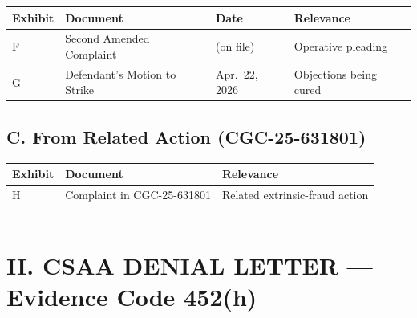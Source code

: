 {\def\LTcaptype{table} %
\begin{longtable}[]{@{}
  >{\raggedright\arraybackslash}p{}
  >{\raggedright\arraybackslash}p{}
  >{\raggedright\arraybackslash}p{}
  >{\raggedright\arraybackslash}p{}@{}}
\toprule\noalign{}
\begin{minipage}[b]{\linewidth}\raggedright
Exhibit
\end{minipage} & \begin{minipage}[b]{\linewidth}\raggedright
Document
\end{minipage} & \begin{minipage}[b]{\linewidth}\raggedright
Date
\end{minipage} & \begin{minipage}[b]{\linewidth}\raggedright
Relevance
\end{minipage} \\
\midrule\noalign{}
\endhead
\bottomrule\noalign{}
\endlastfoot
F & Second Amended Complaint & (on file) & Operative pleading \\
G & Defendant's Motion to Strike & Apr.~22, 2026 & Objections being cured \\
\end{longtable}
}

\subsection{C. From Related Action (CGC-25-631801)}\label{c.-from-related-action-cgc-25-631801}

{\def\LTcaptype{table} %
\begin{longtable}[]{@{}lll@{}}
\toprule\noalign{}
Exhibit & Document & Relevance \\
\midrule\noalign{}
\endhead
\bottomrule\noalign{}
\endlastfoot
H & Complaint in CGC-25-631801 & Related extrinsic-fraud action \\
\end{longtable}
}

\begin{center}\rule{0.5\linewidth}{0.5pt}\end{center}

\section{II. CSAA DENIAL LETTER --- Evidence Code \textsection{} 452(h)}\label{ii.-csaa-denial-letter-evidence-code-452h}

